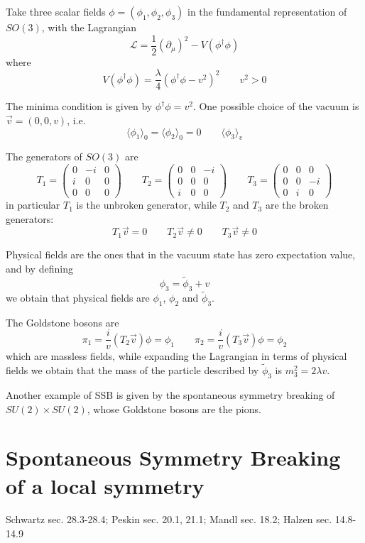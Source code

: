 \documentclass[TheoreticalPhy_ModB.tex]{subfiles}
\begin{document}
\begin{example}[$SO(3)\to SO(2)$ SSB]

Take three scalar fields $\phi=(\phi_1,\phi_2,\phi_3)$ in the fundamental representation of $SO(3)$, with the Lagrangian
\[\mathcal L=\frac12(\partial_\mu)^2-V(\phi^\dagger\phi)\]
where
\[V(\phi^\dagger\phi)=\frac\lambda4(\phi^\dagger\phi-v^2)^2\qquad v^2>0\]

The minima condition is given by $\phi^\dagger\phi=v^2$. One possible choice of the vacuum is $\vec v=(0,0,v)$, i.e.
\[\langle\phi_1\rangle_0=\langle\phi_2\rangle_0=0\qquad\langle\phi_3\rangle_v\]

The generators of $SO(3)$ are
\[T_1=\left(\begin{array}{ccc}0 & -i & 0 \\i & 0 & 0 \\0 & 0 & 0\end{array}\right)
\qquad
T_2=\left(\begin{array}{ccc}0 & 0 & -i \\0 & 0 & 0 \\i & 0 & 0\end{array}\right)
\qquad
T_3=\left(\begin{array}{ccc}0 & 0 & 0 \\0 & 0 & -i \\0 & i & 0\end{array}\right)
\]
in particular $T_1$ is the unbroken generator, while $T_2$ and $T_3$ are the broken generators:
\[T_1\vec v=0\qquad T_2\vec v\neq0\qquad T_3\vec v\neq0\]

Physical fields are the ones that in the vacuum state has zero expectation value, and by defining
\[\phi_3=\tilde\phi_3+v\]
we obtain that physical fields are $\phi_1$, $\phi_2$ and $\tilde\phi_3$. 

The Goldstone bosons are
\[\pi_1=\frac iv(T_2\vec v)\phi=\phi_1\qquad \pi_2=\frac iv(T_3\vec v)\phi=\phi_2\]
which are massless fields, while expanding the Lagrangian in terms of physical fields we obtain that the mass of the particle described by $\tilde\phi_3$ is $m_3^2=2\lambda v$. 


\end{example}

Another example of SSB is given by the spontaneous symmetry breaking of $SU(2)\times SU(2)$, whose Goldstone bosons are the pions. 

\section{Spontaneous Symmetry Breaking of a local symmetry}
\textsf{Schwartz sec. 28.3-28.4; Peskin sec. 20.1, 21.1; Mandl sec. 18.2; Halzen sec. 14.8-14.9}\\
\end{document}
